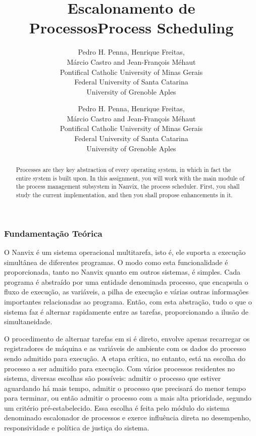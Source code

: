 \documentclass[11pt]{article}
\title{Escalonamento de Processos}
\author{
	Pedro H. Penna, Henrique Freitas,\\%
	Márcio Castro and Jean-François Méhaut\\[0.3em]
	\small Pontifical Catholic University of Minas Gerais\\
	\small Federal University of Santa Catarina\\
	\small University of Grenoble Aples}
\date{}
\title{Process Scheduling}
\author{
	Pedro H. Penna, Henrique Freitas,\\%
	Márcio Castro and Jean-François Méhaut\\[0.3em]
	\small Pontifical Catholic University of Minas Gerais\\
	\small Federal University of Santa Catarina\\
	\small University of Grenoble Aples}
\date{}
\newif\ifbr
\newif\ifen
\begin{document}
\maketitle

\begin{abstract}

\ifbr
	\noindent Processos consistem na abstração fundamental de um sistema
	operacional: todo o resto do sistema é arquitetado com base nesta
	entidade. Neste projeto, você trabalhará com o principal componente do
	módulo de gerenciamento de processos do Nanvix, o escalonador de
	processos. Primeiramente, você irá estudar como o componente existente
	opera e, em seguida, irá propor melhorias a ele.
\else\ifen
	\noindent Processes are they key abstraction of every operating
	system, in which in fact the entire system is built upon. In this
	assignment, you will work with the main module of the process
	management subsystem in Nanvix, the process scheduler. First, you shall
	study the current implementation, and then you shall propose
	enhancements in it.
\fi\fi

\end{abstract}

\ifbr
	\subsubsection*{Fundamentação Teórica}

		O Nanvix é um sistema operacional multitarefa, isto é, ele suporta a
		execução simultânea de diferentes programas. O modo como esta
		funcionalidade é proporcionada, tanto no Nanvix quanto em outros
		sistemas, é simples. Cada programa é abstraído por uma entidade
		denominada processo, que encapsula o fluxo de execução, as
		variáveis, a pilha de execução e várias outras informações
		importantes relacionadas ao programa. Então, com esta abstração,
		tudo o que o sistema faz é alternar rapidamente entre as tarefas,
		proporcionando a ilusão de simultaneidade.

		O procedimento de alternar tarefas em si é direto, envolve apenas
		recarregar os registradores de máquina e as variáveis de ambiente
		com os dados do processo sendo admitido para execução. A etapa
		crítica, no entanto, está na escolha do processo a ser admitido para
		execução. Com vários processos residentes no sistema, diversas
		escolhas são possíveis: admitir o processo que estiver aguardando há
		mais tempo, admitir o processo que precisará do menor tempo para
		terminar, ou então admitir o processo com a mais alta prioridade,
		segundo um critério pré-estabelecido. Essa escolha é feita pelo
		módulo do sistema denominado escalonador de processos e exerce
		influência direta no desempenho, responsividade e política de
		justiça do sistema.
\else\ifen
\end{document}
